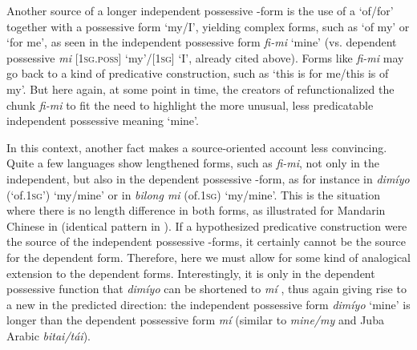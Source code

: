 \documentclass[output=paper]{langsci/langscibook}
\begin{document}
Another source of a longer independent possessive -form is the use of a  ‘of/for’ together with a possessive  form ‘my/I’, yielding complex forms, such as ‘of my’ or ‘for me’, as seen in the  independent possessive form \textit{fi-mi} ‘mine’ (vs. dependent possessive \textit{mi} [\textsc{1sg.poss]} ‘my’/[1\textsc{sg]} ‘I’, already cited above). Forms like \textit{fi-mi} may go back to a kind of predicative construction, such as ‘this is for me/this is of my’. But here again, at some point in time, the creators of  refunctionalized the chunk \textit{fi-mi} to fit the need to highlight the more unusual, less predicatable independent possessive meaning ‘mine’. 


In this context, another fact makes a source-oriented account less convincing. Quite a few  languages show lengthened forms, such as \textit{fi-mi}, not only in the independent, but also in the dependent possessive -form, as for instance in  \textit{dimíyo} (‘of.1\textsc{sg}’) ‘my/mine’ or in  \textit{bilong mi} (of.1\textsc{sg}) ‘my/mine’. This is the situation where there is no length difference in both forms, as illustrated for Mandarin  Chinese in  (identical pattern in ). If a hypothesized predicative construction were the source of the independent possessive -forms, it certainly cannot be the source for the dependent form. Therefore, here we must allow for some kind of analogical extension to the dependent forms. Interestingly, it is only in the dependent possessive function that \textit{dimíyo} can be shortened to \textit{mí} \citep{Steinkrüger2013}, thus again giving rise to a new  in the predicted direction: the independent possessive form \textit{dimíyo} ‘mine’ is longer than the dependent possessive form \textit{mí} (similar to  \textit{mine/my} and Juba Arabic \textit{bitai/tái}).
\end{document}
